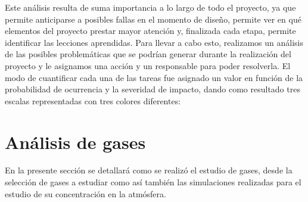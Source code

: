 \documentclass[11pt,titlepage]{article}
\begin{document}
Este análisis resulta de suma importancia a lo largo de todo el proyecto, ya que permite anticiparse a posibles fallas en el momento de diseño, permite ver en qué elementos del proyecto prestar mayor atención y, finalizada cada etapa, permite identificar las lecciones aprendidas.
Para llevar a cabo esto, realizamos un análisis de las posibles problemáticas que se podrían generar durante la realización del proyecto y le asignamos una acción y un responsable para poder resolverla. El modo de cuantificar cada una de las tareas fue asignado un valor en función de la probabilidad de ocurrencia y la severidad de impacto, dando como resultado tres escalas representadas con tres colores diferentes:


%
%

\newpage

\section{Análisis de gases}

En la presente sección se detallará como se realizó el estudio de gases, desde la selección de gases a estudiar como así también las simulaciones realizadas para el estudio de su concentración en la atmósfera.
\end{document}
